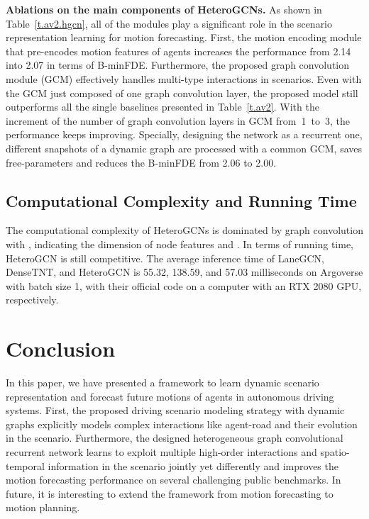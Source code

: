 \documentclass[letterpaper, 10 pt, conference]{ieeeconf}
\begin{document}
\textbf{Ablations on the main components of HeteroGCNs.} As shown in Table~\ref{t.av2.hgcn}, all of the modules play a significant role in the scenario representation learning for motion forecasting. First, the motion encoding module that pre-encodes motion features of agents
increases the performance from 2.14 into 2.07 in terms of B-minFDE. Furthermore, the proposed graph convolution module (GCM) effectively handles multi-type interactions in  scenarios. Even with the GCM just composed of one graph convolution layer, the proposed model still outperforms all the single baselines presented in Table~\ref{t.av2}. With the increment of the number of graph convolution layers in GCM from~1~to~3, the performance keeps improving. Specially, designing the network as a recurrent one,  different snapshots of a dynamic graph are processed with a common GCM,  saves free-parameters and reduces the B-minFDE from 2.06 to 2.00. 


\subsection{Computational Complexity and Running Time}
The computational complexity of HeteroGCNs is dominated by graph convolution with ,  indicating the dimension of node features and . In terms of running time, HeteroGCN is still competitive. The average inference time of LaneGCN, DenseTNT, and  HeteroGCN  is 55.32, 138.59, and 57.03 milliseconds on Argoverse with batch size 1,  with their official code on a computer with an RTX 2080 GPU, respectively.
           
\section{Conclusion}
\label{sec:conclusion}
In this paper, we have presented a framework to learn dynamic scenario representation and forecast future motions of agents in autonomous driving systems. First, the proposed driving scenario modeling strategy with dynamic graphs explicitly models complex interactions like agent-road and their evolution in the scenario. Furthermore, 
the designed heterogeneous graph convolutional recurrent network
learns to exploit multiple high-order interactions and spatio-temporal information in the scenario jointly yet differently and improves the motion forecasting performance on several challenging public benchmarks.  In future, it is interesting to extend the framework from motion forecasting to motion planning.



\end{document}
